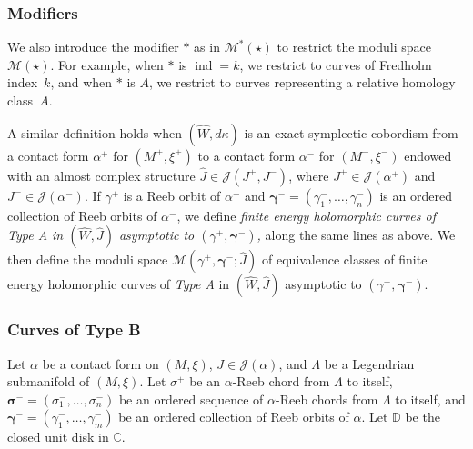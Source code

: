 \documentclass[10pt]{amsart}
\let\mathcal\mathscr
\theoremstyle{plain}
\theoremstyle{definition}
\numberwithin{equation}{subsection}
\newcommand{\CC}{\mathbb{C}}
\let\op\operatorname
\let\bs\boldsymbol
\begin{document}
\subsubsection*{Modifiers}
We also introduce the modifier $\ast$ as in $\mathcal{M}^\ast(\star)$ to restrict the moduli space $\mathcal{M}(\star)$. For example, when $\ast$ is $\op{ind}=k$, we restrict to curves of Fredholm index~$k$, and when $\ast$ is $A$, we restrict to curves representing a relative homology class~$A$.

\smallskip
A similar definition holds when $(\widehat W,d\kappa)$ is an exact symplectic cobordism from a contact form $\alpha^+$ for $(M^+,\xi^+)$ to a contact form $\alpha^-$ for $(M^-,\xi^-)$ endowed with an almost complex structure $\widehat{J}\in \mathcal{J}(J^+,J^-)$, where $J^+ \in \mathcal{J}(\alpha^+)$ and $J^- \in \mathcal{J}(\alpha^-)$. If $\gamma^+$ is a Reeb orbit of $\alpha^+$ and $\bs\gamma^-=(\gamma^-_1,\dots,\gamma^-_n)$ is an ordered collection of Reeb orbits of $\alpha^-$, we define {\em finite energy holomorphic curves of \emph{Type A} in $(\widehat{W},\widehat{J})$ asymptotic to $(\gamma^+,\bs\gamma^-)$,} along the same lines as above. We then define the moduli space ${\mathcal{M}}(\gamma^+,\bs\gamma^-;\widehat{J})$ of equivalence classes of finite energy holomorphic curves of \emph{Type A} in $(\widehat W,\widehat{J})$ asymptotic to $(\gamma^+,\bs\gamma^-)$.

\subsubsection{Curves of {Type B}} \label{subsubsection: B}

Let $\alpha$ be a contact form on $(M,\xi)$, $J\in \mathcal{J}(\alpha)$, and $\Lambda$ be a Legendrian submanifold of $(M,\xi)$. Let $\sigma^+$ be an $\alpha$-Reeb chord from $\Lambda$ to itself, $\bs\sigma^-=(\sigma^-_1,\dots,\sigma^-_n)$ be an ordered sequence of $\alpha$-Reeb chords from $\Lambda$ to itself, and $\bs\gamma^-=(\gamma^-_1,\dots,\gamma^-_m)$ be an ordered collection of Reeb orbits of $\alpha$. Let $\mathbb{D}$ be the closed unit disk in $\CC$.
\end{document}
